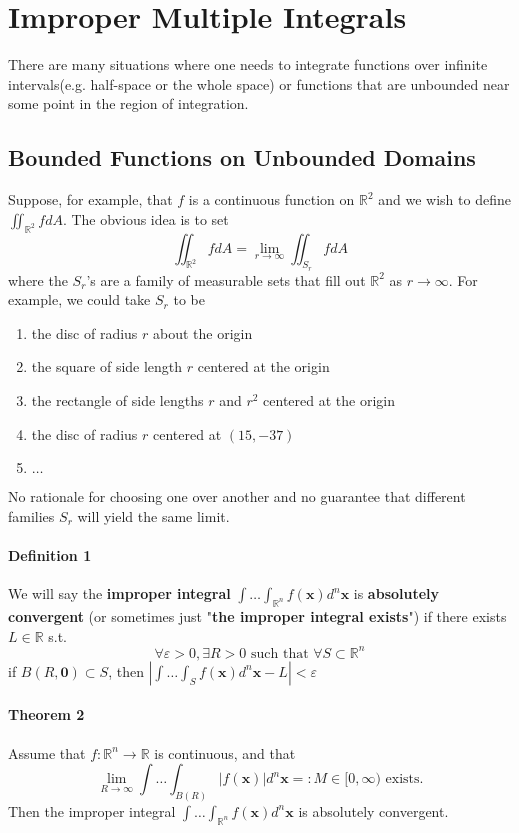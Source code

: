 \documentclass[11pt]{article}
\newcommand{\tb}[1]{\textbf{#1}}
\newcommand{\real}[0]{\mathbb{R}}
\newcommand{\vx}[0]{\tb{x}}
\newcommand{\vo}[0]{\tb{0}}
\begin{document}
\section{Improper Multiple Integrals}
There are many situations where one needs to integrate functions over infinite intervals(e.g. half-space or the whole space) or functions that are unbounded near some point in the region of integration. 
\subsection{Bounded Functions on Unbounded Domains}
Suppose, for example, that $f$ is a continuous function on $\real^2$ and we wish to define $\iint_{\real^2}fdA$. The obvious idea is to set $$\iint_{\real^2} fdA = \underset{r\rightarrow\infty}{\lim} \iint_{S_r}fdA$$ where the $S_r$'s are a family of measurable sets that fill out $\real^2$ as $r \rightarrow \infty$. For example, we could take $S_r$ to be 
\begin{enumerate}
    \item the disc of radius $r$ about the origin
    \item the square of side length $r$ centered at the origin
    \item the rectangle of side lengths $r$ and $r^2$ centered at the origin
    \item the disc of radius $r$ centered at $(15, -37)$
    \item $\hdots$
\end{enumerate}
No rationale for choosing one over another and no guarantee that different families $S_r$ will yield the same limit.
\paragraph{Definition 1} We will say the \tb{improper integral} $\int \hdots \int_{\real^n} f(\vx)d^n\vx$ is \tb{absolutely convergent} (or sometimes just "\tb{the improper integral exists}") if there exists $L \in \real$ s.t.
$$\forall \varepsilon >0, \exists R > 0 \mbox{ such that } \forall S \subset \real^n$$
if $B(R, \vo) \subset S$, then $|\int \hdots \int_S f(\vx) d^n\vx - L| < \varepsilon$

\paragraph{Theorem 2} Assume that $f: \real^n \rightarrow \real$ is continuous, and that
$$\underset{R \rightarrow \infty}{\lim} \int \hdots \int_{B(R)} |f(\vx)|d^n\vx =: M \in [0, \infty) \mbox{ exists.}$$
Then the improper integral $\int \hdots \int_{\real^n}f(\vx)d^n\vx$ is absolutely convergent.
\end{document}
